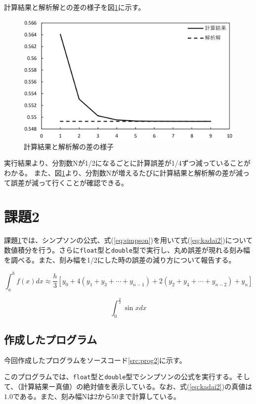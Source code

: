 \documentclass[10pt,titlepage]{jsarticle}
\begin{document}
計算結果と解析解との差の様子を図\ref{fig:kadai1}に示す。
\begin{figure}[H]
\centering
\includegraphics[width=12cm]{img/kadai1.png}
\caption{計算結果と解析解の差の様子}
\label{fig:kadai1}
\end{figure}
実行結果より、分割数Nが1/2になるごとに計算誤差が1/4ずつ減っていることがわかる。
また、図\ref{fig:kadai1}より、分割数Nが増えるたびに計算結果と解析解の差が減って誤差が減って行くことが確認できる。

\section{課題2}
\label{sec:kadai2}

課題\ref{sec:kadai2}では、シンプソンの公式、式(\ref{eq:simpson})を用いて式(\ref{eq:kadai2})について数値積分を行う。さらに{\tt float}型と{\tt double}型で実行し、丸め誤差が現れる刻み幅を調べる。また、刻み幅を1/2にした時の誤差の減り方について報告する。

\begin{equation}
\label{eq:simpson}
	\int_a^b f(x) dx \approx \frac{h}{3}[y_0+4(y_1+y_3+\cdots+y_{n-1})+2(y_2+y_4+\cdots+y_{n-2})+y_n]
\end{equation}

\begin{equation}
\label{eq:kadai2}
	\int_0^\frac{\pi}{2} \sin x dx
\end{equation}

\subsection{作成したプログラム}
今回作成したプログラムをソースコード\ref{src:prog2}に示す。



このプログラムでは、{\tt float}型と{\tt double}型でシンプソンの公式を実行する。そして、（計算結果ー真値）の絶対値を表示している。なお、式(\ref{eq:kadai2})の真値は$1.0$である。また、刻み幅Nは2から50まで計算している。
\end{document}
